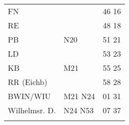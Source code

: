 \begin{tabular}{!{\color{schiefergrau}\vrule width 3pt}*{3}{l!{\color{schiefergrau}\vrule width 3pt}}}
FN           &                                                            & 46 16 \\
RE           &                                                            & 48 18 \\
PB           & \nbus{} N20                                                & 51 21 \\
LD           &                                                            & 53 23 \\
KB           & \mbus{} M21                                                & 55 25 \\
RR (Eichb)   &                                                            & 58 28 \\
BWIN/WIU     & \mbus{} M21 \nbus{} N24                                    & 01 31 \\
Wilhelmsr. D.& \nbus{} N24 N53                                            & 07 37 \\
\myhline
\end{tabular}

